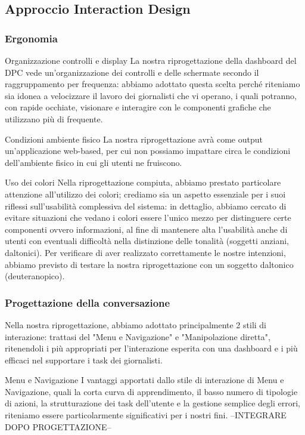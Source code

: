 \subsection{Approccio Interaction Design}

\subsubsection{Ergonomia}

Organizzazione controlli e display
La nostra riprogettazione della dashboard del DPC vede un'organizzazione dei controlli e delle schermate secondo il raggruppamento per frequenza: abbiamo adottato questa scelta perché riteniamo sia idonea a velocizzare il lavoro dei giornalisti che vi operano, i quali potranno, con rapide occhiate, visionare e interagire con le componenti grafiche che utilizzano più di frequente.

Condizioni ambiente fisico
La nostra riprogettazione avrà come output un'applicazione web-based, per cui non possiamo impattare circa le condizioni dell'ambiente fisico in cui gli utenti ne fruiscono.

Uso dei colori
Nella riprogettazione compiuta, abbiamo prestato particolare attenzione all'utilizzo dei colori; crediamo sia un aspetto essenziale per i suoi riflessi sull'usabilità complessiva del sistema: in dettaglio, abbiamo cercato di evitare situazioni che vedano i colori essere l'unico mezzo per distinguere certe componenti ovvero informazioni, al fine di mantenere alta l'usabilità anche di utenti con eventuali difficoltà nella distinzione delle tonalità (soggetti anziani, daltonici).
Per verificare di aver realizzato correttamente le nostre intenzioni, abbiamo previsto di testare la nostra riprogettazione con un soggetto daltonico (deuteranopico).  

\subsubsection{Progettazione della conversazione}
Nella nostra riprogettazione, abbiamo adottato principalmente 2 stili di interazione: trattasi del "Menu e Navigazione" e "Manipolazione diretta", ritenendoli i più appropriati per l'interazione esperita con una dashboard e i più efficaci nel supportare i task dei giornalisti.

Menu e Navigazione
I vantaggi apportati dallo stile di interazione di Menu e Navigazione, quali la corta curva di apprendimento, il basso numero di tipologie di azioni, la strutturazione dei task dell'utente e la gestione semplice degli errori, riteniamo essere particolarmente significativi per i nostri fini.
--INTEGRARE DOPO PROGETTAZIONE--

